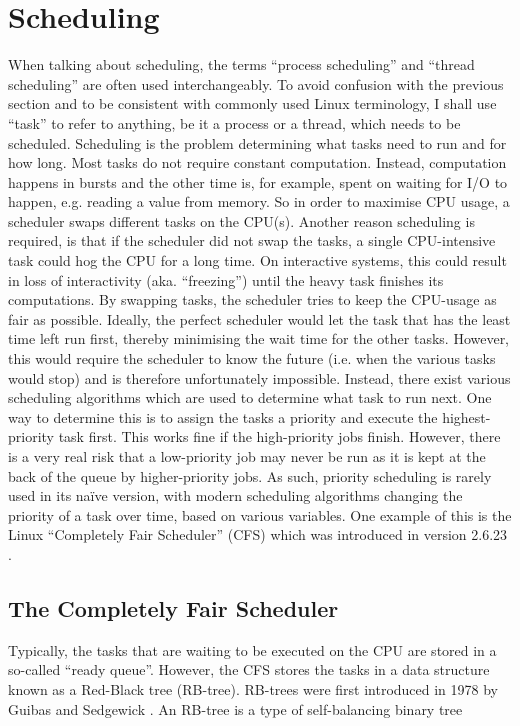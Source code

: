 \section{Scheduling}
When talking about scheduling, the terms ``process scheduling'' and ``thread
scheduling'' are often used interchangeably. To avoid confusion with the
previous section and to be consistent with commonly used Linux terminology, I
shall use ``task'' to refer to anything, be it a process or a thread, which
needs to be scheduled. Scheduling is the problem determining what tasks need to
run and for how long. Most tasks do not require constant computation. Instead,
computation happens in bursts and the other time is, for example, spent on
waiting for I/O to happen, e.g. reading a value from memory. So in order to
maximise CPU usage, a scheduler swaps different tasks on the CPU(s). Another
reason scheduling is required, is that if the scheduler did not swap the tasks,
a single CPU-intensive task could hog the CPU for a long time. On interactive
systems, this could result in loss of interactivity (aka. ``freezing'') until
the heavy task finishes its computations. By swapping tasks, the scheduler tries
to keep the CPU-usage as fair as possible. Ideally, the perfect scheduler would
let the task that has the least time left run first, thereby minimising the wait
time for the other tasks. However, this would require the scheduler to know the
future (i.e. when the various tasks would stop) and is therefore unfortunately
impossible. Instead, there exist various scheduling algorithms which are used to
determine what task to run next. One way to determine this is to assign the
tasks a priority and execute the highest-priority task first. This works fine if
the high-priority jobs finish. However, there is a very real risk that a
low-priority job may never be run as it is kept at the back of the queue by
higher-priority jobs. As such, priority scheduling is rarely used in its
na{\" i}ve version, with modern scheduling algorithms changing the priority of a
task over time, based on various variables. One example of this is the Linux
``Completely Fair Scheduler'' (CFS) which was introduced in version 2.6.23
\cite{noauthor_cfs_nodate}.

    \subsection{The Completely Fair Scheduler}
    Typically, the tasks that are waiting to be executed on the CPU are stored
    in a so-called ``ready queue''. However, the CFS stores the tasks in a
    data structure known as a Red-Black tree (RB-tree). RB-trees were first
    introduced in 1978 by Guibas and Sedgewick \cite{guibas_dichromatic_1978}.
    An RB-tree is a type of self-balancing binary tree 

